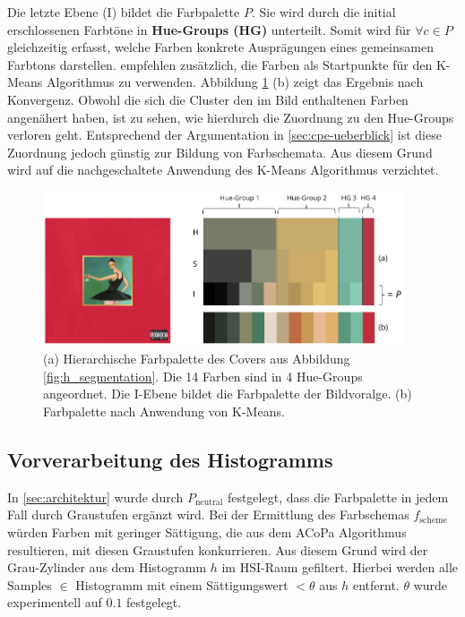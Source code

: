 Die letzte Ebene (I) bildet die Farbpalette $P$. Sie wird durch die initial erschlossenen Farbtöne in \textbf{Hue-Groups (HG)} unterteilt. Somit wird für $\forall c \in P$ gleichzeitig erfasst, welche Farben konkrete Ausprägungen eines gemeinsamen Farbtons darstellen. \citet{acopa} empfehlen zusätzlich, die Farben als Startpunkte für den K-Means Algorithmus zu verwenden. Abbildung \ref{fig:palette} (b) zeigt das Ergebnis nach Konvergenz. Obwohl die sich die Cluster den im Bild enthaltenen Farben angenähert haben, ist zu sehen, wie hierdurch die Zuordnung zu den Hue-Groups verloren geht. Entsprechend der Argumentation in \autoref{sec:cpe-ueberblick} ist diese Zuordnung jedoch günstig zur Bildung von Farbschemata. Aus diesem Grund wird auf die nachgeschaltete Anwendung des K-Means Algorithmus verzichtet.

\begin{figure}[]
\centering
\includegraphics[width=0.95\textwidth]{img/palette.png}
\caption{(a) Hierarchische Farbpalette des Covers aus Abbildung \ref{fig:h_segmentation}. Die 14 Farben sind in 4 Hue-Groups angeordnet. Die I-Ebene bildet die Farbpalette der Bildvoralge. (b) Farbpalette nach Anwendung von K-Means.}
\label{fig:palette}
\end{figure}

\subsection{Vorverarbeitung des Histogramms}
\label{sec:vorverarbeitung}

In \autoref{sec:architektur} wurde durch $P_\text{neutral}$ festgelegt, dass die Farbpalette in jedem Fall durch Graustufen ergänzt wird. Bei der Ermittlung des Farbschemas $f_\text{scheme}$ würden Farben mit geringer Sättigung, die aus dem ACoPa Algorithmus resultieren, mit diesen Graustufen konkurrieren. Aus diesem Grund wird der \glqq{}Grau-Zylinder\grqq{} \citep{acopa} aus dem Histogramm $h$ im HSI-Raum gefiltert. Hierbei werden alle Samples $\in$ Histogramm mit einem Sättigungswert $< \theta$ aus $h$ entfernt. $\theta$ wurde experimentell auf $0.1$ festgelegt.

